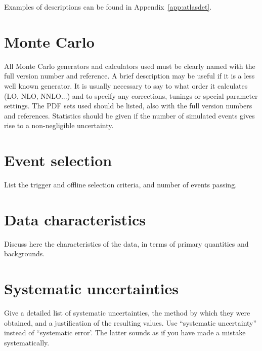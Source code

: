 \documentclass[PAPER,UKenglish,texlive=2016]{\ATLASLATEXPATH atlasdoc}
\begin{document}
Examples of descriptions can be found in Appendix~\ref{app:atlasdet}.


\section{Monte Carlo}
\label{sec:MC}

All Monte Carlo generators and calculators used must be clearly named with the full version number and reference.
A brief description may be useful if it is a less well known generator.
It is usually necessary to say to what order it calculates (LO, NLO, NNLO...)
and to specify any corrections, tunings or special parameter settings.
The PDF sets used should be listed, also with the full version numbers and references.
Statistics should be given if the number of simulated events gives rise to a non-negligible uncertainty.


\section{Event selection}
\label{sec:selection}

List the trigger and offline selection criteria, and number of events passing.


\section{Data characteristics}
\label{sec:control}

Discuss here the characteristics of the data, in terms of primary quantities and backgrounds.


\section{Systematic uncertainties}
\label{sec:syst}

Give a detailed list of systematic uncertainties, the method by which they were obtained,
and a justification of the resulting values.
Use ``systematic uncertainty'' instead of ``systematic error'.
The latter sounds as if you have made a mistake systematically.
\end{document}
